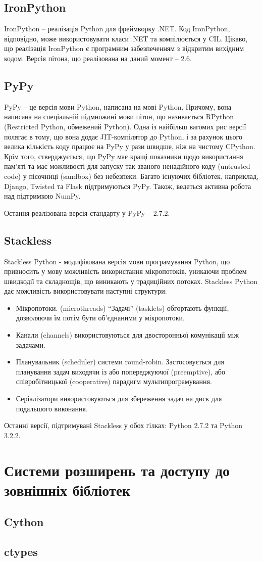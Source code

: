 \documentclass[a4paper, 12pt, onsedie]{article}
\begin{document}
\subsection{IronPython}
IronPython -- реалізація Python для фреймворку .NET. Код IronPython, відповідно, може 
використовувати класи .NET та компілюється у CIL. Цікаво, що реалізація IronPython є 
програмним забезпеченням з відкритим вихідним кодом. Версія пітона, що реалізована на даний 
момент -- 2.6.

\subsection{PyPy}
PyPy -- це версія мови Python, написана на мові Python. Причому, вона написана на спеціальній 
підмножині мови пітон, що називається RPython (Restricted Python, обмежений Python). Одна 
із найбільш вагомих рис версії полягає в тому, що вона додає JIT-компілятор до Python, і за 
рахунок цього велика кількість коду працює на PyPy у рази швидше, ніж на чистому CPython. 
Крім того, стверджується, що PyPy має кращі показники щодо використання пам'яті та має 
можливості для запуску так званого ненадійного коду (untrusted code) у пісочниці (sandbox) 
без небезпеки. Багато існуючих бібліотек, наприклад, Django, Twisted та Flask підтримуються 
PyPy. Також, ведеться активна робота над підтримкою NumPy.

Остання реалізована версія стандарту у PyPy -- 2.7.2.

\subsection{Stackless}
Stackless Python - модифікована версія мови програмування Python, що привносить у мову
можливість використання мікропотоків, уникаючи проблем швидкодії та складнощів, що виникають
у традиційних потоках. Stackless Python дає можливість використовувати наступні структури:
\begin{itemize}
    \item Мікропотоки. (microthreads) ``Задачі'' (tasklets) обгортають функції, дозволяючи їм 
          потім бути об'єднаними у мікропотоки.
    \item Канали (channels) використовуються для двосторонньої комунікації між задачами.
    \item Планувальник (scheduler) системи round-robin. Застосовується для планування
          задач виходячи із або попереджуючої (preemptive), або співробітницької (cooperative) 
          парадигм мультипрограмування.
    \item Серіалізатори використовуються для збереження задач на диск для подальшого виконання.
\end{itemize}

Останні версії, підтримувані Stackless у обох гілках: Python 2.7.2 та Python 3.2.2.

\section{Системи розширень та доступу до зовнішніх бібліотек}

\subsection{Cython}

\subsection{ctypes}
\end{document}

